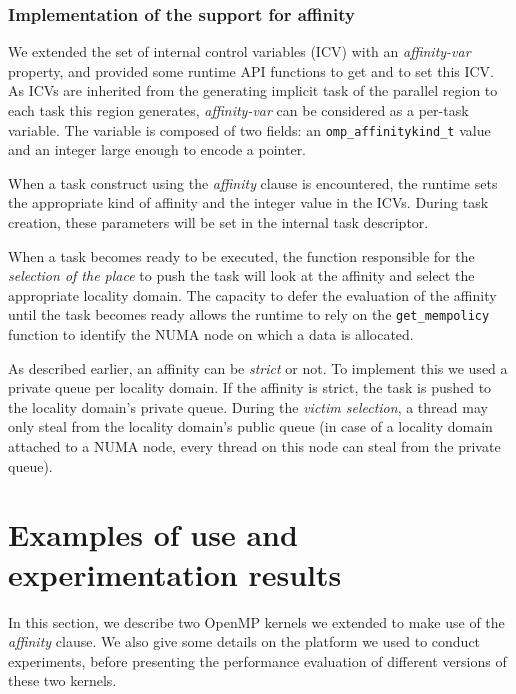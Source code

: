 \documentclass{Styles/llncs}
\newcommand{\TG}[1]{{\color{red}\bfseries TG: #1}}
\begin{document}
\subsubsection{Implementation of the support for affinity}
We extended the set of internal control variables (ICV) with an \textit{affinity-var} property, and provided some runtime API functions to get and to set this ICV. As ICVs are inherited from the generating implicit task of the parallel region to each task this region generates, \textit{affinity-var} can be considered as a per-task variable. The variable is composed of two fields: an \texttt{omp\_affinitykind\_t} value and an integer large enough to encode a pointer.


When a task construct using the \textit{affinity} clause is encountered, the runtime sets the appropriate kind of affinity and the integer value in the ICVs.
During task creation, these parameters will be set in the internal task descriptor.

When a task becomes ready to be executed, the function responsible for the \textit{selection of the place} to push
the task will look at the affinity and select the appropriate locality domain. The capacity to defer the evaluation of the affinity until the task becomes ready allows the runtime to rely on the \verb/get_mempolicy/ function to identify the NUMA node on which a data is allocated.

As described earlier, an affinity can be \emph{strict} or not. To implement this we used
a private queue per locality domain. If the affinity is strict, the task is pushed to the locality domain's private queue.
During the \textit{victim selection}, a thread may only steal from the locality domain's
public queue (in case of a locality domain attached to a NUMA node, every thread on this node can steal from the private queue).

\section{Examples of use and experimentation results}

In this section, we describe two OpenMP kernels we extended to make use of the \emph{affinity} clause. We also give some details on the platform we used to conduct experiments, before presenting the performance evaluation of different versions of these two kernels.
\end{document}
